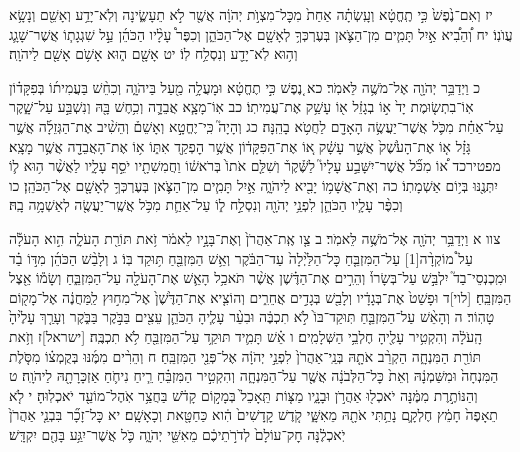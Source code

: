 \documentclass[twoside, openany, parskip=half, 11pt]{book}
\begin{document}
יז וְאִם־נֶ֙פֶשׁ֙ כִּ֣י תֶֽחֱטָ֔א וְעָֽשְׂתָ֗ה אַחַת֙ מִכׇּל־מִצְוֺ֣ת יְהֹוָ֔ה אֲשֶׁ֖ר לֹ֣א תֵעָשֶׂ֑ינָה וְלֹֽא־יָדַ֥ע וְאָשֵׁ֖ם וְנָשָׂ֥א עֲוֺנֽוֹ׃ יח וְ֠הֵבִ֠יא אַ֣יִל תָּמִ֧ים מִן־הַצֹּ֛אן בְּעֶרְכְּךָ֥ לְאָשָׁ֖ם אֶל־הַכֹּהֵ֑ן וְכִפֶּר֩ עָלָ֨יו הַכֹּהֵ֜ן עַ֣ל שִׁגְגָת֧וֹ אֲשֶׁר־שָׁגָ֛ג וְה֥וּא לֹֽא־יָדַ֖ע וְנִסְלַ֥ח לֽוֹ׃ יט אָשָׁ֖ם ה֑וּא אָשֹׁ֥ם אָשַׁ֖ם לַיהֹוָֽה׃

כ וַיְדַבֵּ֥ר יְהֹוָ֖ה אֶל־מֹשֶׁ֥ה לֵּאמֹֽר׃ כא נֶ֚פֶשׁ כִּ֣י תֶחֱטָ֔א וּמָעֲלָ֥ה מַ֖עַל בַּיהֹוָ֑ה וְכִחֵ֨שׁ בַּעֲמִית֜וֹ בְּפִקָּד֗וֹן אֽוֹ־בִתְשׂ֤וּמֶת יָד֙ א֣וֹ בְגָזֵ֔ל א֖וֹ עָשַׁ֥ק אֶת־עֲמִיתֽוֹ׃ כב אֽוֹ־מָצָ֧א אֲבֵדָ֛ה וְכִ֥חֶשׁ בָּ֖הּ וְנִשְׁבַּ֣ע עַל־שָׁ֑קֶר עַל־אַחַ֗ת מִכֹּ֛ל אֲשֶׁר־יַעֲשֶׂ֥ה הָאָדָ֖ם לַחֲטֹ֥א בָהֵֽנָּה׃ כג וְהָיָה֮ כִּֽי־יֶחֱטָ֣א וְאָשֵׁם֒ וְהֵשִׁ֨יב אֶת־הַגְּזֵלָ֜ה אֲשֶׁ֣ר גָּזָ֗ל א֤וֹ אֶת־הָעֹ֙שֶׁק֙ אֲשֶׁ֣ר עָשָׁ֔ק א֚וֹ אֶת־הַפִּקָּד֔וֹן אֲשֶׁ֥ר הׇפְקַ֖ד אִתּ֑וֹ א֥וֹ אֶת־הָאֲבֵדָ֖ה אֲשֶׁ֥ר מָצָֽא׃ מפטירכד א֠וֹ מִכֹּ֞ל אֲשֶׁר־יִשָּׁבַ֣ע עָלָיו֮ לַשֶּׁ֒קֶר֒ וְשִׁלַּ֤ם אֹתוֹ֙ בְּרֹאשׁ֔וֹ וַחֲמִשִׁתָ֖יו יֹסֵ֣ף עָלָ֑יו לַאֲשֶׁ֨ר ה֥וּא ל֛וֹ יִתְּנֶ֖נּוּ בְּי֥וֹם אַשְׁמָתֽוֹ׃ כה וְאֶת־אֲשָׁמ֥וֹ יָבִ֖יא לַיהֹוָ֑ה אַ֣יִל תָּמִ֧ים מִן־הַצֹּ֛אן בְּעֶרְכְּךָ֥ לְאָשָׁ֖ם אֶל־הַכֹּהֵֽן׃ כו וְכִפֶּ֨ר עָלָ֧יו הַכֹּהֵ֛ן לִפְנֵ֥י יְהֹוָ֖ה וְנִסְלַ֣ח ל֑וֹ עַל־אַחַ֛ת מִכֹּ֥ל אֲשֶֽׁר־יַעֲשֶׂ֖ה לְאַשְׁמָ֥ה בָֽהּ׃

צוו א וַיְדַבֵּ֥ר יְהֹוָ֖ה אֶל־מֹשֶׁ֥ה לֵּאמֹֽר׃ ב צַ֤ו אֶֽת־אַהֲרֹן֙ וְאֶת־בָּנָ֣יו לֵאמֹ֔ר זֹ֥את תּוֹרַ֖ת הָעֹלָ֑ה הִ֣וא הָעֹלָ֡ה עַל֩ מוֹקְדָ֨ה‏[1] עַל־הַמִּזְבֵּ֤חַ כׇּל־הַלַּ֙יְלָה֙ עַד־הַבֹּ֔קֶר וְאֵ֥שׁ הַמִּזְבֵּ֖חַ תּ֥וּקַד בּֽוֹ׃ ג וְלָבַ֨שׁ הַכֹּהֵ֜ן מִדּ֣וֹ בַ֗ד וּמִֽכְנְסֵי־בַד֮ יִלְבַּ֣שׁ עַל־בְּשָׂרוֹ֒ וְהֵרִ֣ים אֶת־הַדֶּ֗שֶׁן אֲשֶׁ֨ר תֹּאכַ֥ל הָאֵ֛שׁ אֶת־הָעֹלָ֖ה עַל־הַמִּזְבֵּ֑חַ וְשָׂמ֕וֹ אֵ֖צֶל הַמִּזְבֵּֽחַ׃ [לוי]ד וּפָשַׁט֙ אֶת־בְּגָדָ֔יו וְלָבַ֖שׁ בְּגָדִ֣ים אֲחֵרִ֑ים וְהוֹצִ֤יא אֶת־הַדֶּ֙שֶׁן֙ אֶל־מִח֣וּץ לַֽמַּחֲנֶ֔ה אֶל־מָק֖וֹם טָהֽוֹר׃ ה וְהָאֵ֨שׁ עַל־הַמִּזְבֵּ֤חַ תּֽוּקַד־בּוֹ֙ לֹ֣א תִכְבֶּ֔ה וּבִעֵ֨ר עָלֶ֧יהָ הַכֹּהֵ֛ן עֵצִ֖ים בַּבֹּ֣קֶר בַּבֹּ֑קֶר וְעָרַ֤ךְ עָלֶ֙יהָ֙ הָֽעֹלָ֔ה וְהִקְטִ֥יר עָלֶ֖יהָ חֶלְבֵ֥י הַשְּׁלָמִֽים׃ ו אֵ֗שׁ תָּמִ֛יד תּוּקַ֥ד עַל־הַמִּזְבֵּ֖חַ לֹ֥א תִכְבֶּֽה׃
[ישראל]ז וְזֹ֥את תּוֹרַ֖ת הַמִּנְחָ֑ה הַקְרֵ֨ב אֹתָ֤הּ בְּנֵֽי־אַהֲרֹן֙ לִפְנֵ֣י יְהֹוָ֔ה אֶל־פְּנֵ֖י הַמִּזְבֵּֽחַ׃ ח וְהֵרִ֨ים מִמֶּ֜נּוּ בְּקֻמְצ֗וֹ מִסֹּ֤לֶת הַמִּנְחָה֙ וּמִשַּׁמְנָ֔הּ וְאֵת֙ כׇּל־הַלְּבֹנָ֔ה אֲשֶׁ֖ר עַל־הַמִּנְחָ֑ה וְהִקְטִ֣יר הַמִּזְבֵּ֗חַ רֵ֧יחַ נִיחֹ֛חַ אַזְכָּרָתָ֖הּ לַיהֹוָֽה׃ ט וְהַנּוֹתֶ֣רֶת מִמֶּ֔נָּה יֹאכְל֖וּ אַהֲרֹ֣ן וּבָנָ֑יו מַצּ֤וֹת תֵּֽאָכֵל֙ בְּמָק֣וֹם קָדֹ֔שׁ בַּחֲצַ֥ר אֹֽהֶל־מוֹעֵ֖ד יֹאכְלֽוּהָ׃ י לֹ֤א תֵאָפֶה֙ חָמֵ֔ץ חֶלְקָ֛ם נָתַ֥תִּי אֹתָ֖הּ מֵאִשָּׁ֑י קֹ֤דֶשׁ קׇֽדָשִׁים֙ הִ֔וא כַּחַטָּ֖את וְכָאָשָֽׁם׃ יא כׇּל־זָכָ֞ר בִּבְנֵ֤י אַהֲרֹן֙ יֹֽאכְלֶ֔נָּה חׇק־עוֹלָם֙ לְדֹרֹ֣תֵיכֶ֔ם מֵאִשֵּׁ֖י יְהֹוָ֑ה כֹּ֛ל אֲשֶׁר־יִגַּ֥ע בָּהֶ֖ם יִקְדָּֽשׁ׃
\end{document}
